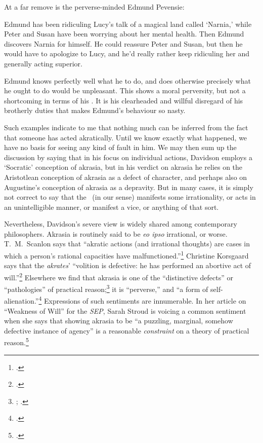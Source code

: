 \documentclass[11pt,letterpaper,oneside]{amsart}
\begin{document}
At a far remove is the perverse-minded Edmund Pevensie:\begin{squote} Edmund has been ridiculing Lucy's talk of a magical land called `Narnia,' while Peter and Susan have been worrying about her mental health. Then Edmund discovers Narnia for himself. He could reassure Peter and Susan, but then he would have to apologize to Lucy, and he'd really rather keep ridiculing her and generally acting superior.\end{squote} Edmund knows perfectly well what he  to do, and does otherwise precisely what he ought to do would be unpleasant. This shows a moral perversity, but not a shortcoming in terms of his . It is his clearheaded and willful disregard of his brotherly duties that makes Edmund's behaviour so nasty.


Such examples indicate to me that nothing much can be inferred from the fact that someone has acted akratically. Until we know exactly what happened, we have no basis for seeing any kind of fault in him. We may then sum up the discussion by saying that in his focus on individual actions, Davidson employs a `Socratic' conception of akrasia, but in his verdict on akrasia he relies on the Aristotlean conception of akrasia as a defect of character, and perhaps also on Augustine's conception of akrasia as a depravity. But in many cases, it is simply not correct to say that the \ak\ (in our sense) manifests some irrationality, or acts in an unintelligible manner, or manifest a vice, or anything of that sort.



Nevertheless, Davidson's severe view is widely shared among contemporary philosophers. Akrasia is routinely said to be \emph{eo ipso} irrational, or worse. T.\ M.\ Scanlon says that ``akratic actions (and irrational thoughts) are cases in which a person's rational capacities have malfunctioned.''\footnote{\citet[p.\ 40]{scanlon1998we}.} Christine Korsgaard says that the \emph{akrates}' ``volition is defective: he has performed an abortive act of will.''\footnote{\citet[p.\ 34]{korsgaard2009self}.} Elsewhere we find that akrasia is one of the ``distinctive defects'' or ``pathologies'' of practical reason;\footnote{\citet[p.\ 224]{wallace1999three}; \citet[p.\ 53]{pettit1993practical}.} it is ``perverse,'' and ``a form of self-alienation.''\footnote{\citet[p.\ 37]{buss1997weakness}.} Expressions of such sentiments are innumerable. In her article on ``Weakness of Will'' for the \emph{SEP}, Sarah Stroud is voicing a common sentiment when she says that showing akrasia to be ``a puzzling, marginal, somehow defective instance of agency'' is a reasonable \emph{constraint} on a theory of practical reason.\footnote{\citet{stroud2008weakness}.}
\end{document}
